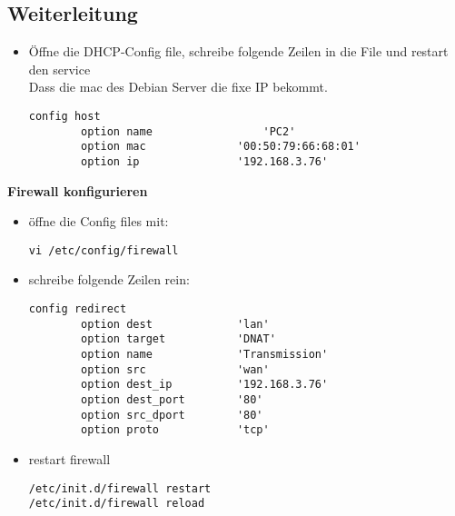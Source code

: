 \subsection{Weiterleitung}
\begin{itemize}
\item Öffne die DHCP-Config file, schreibe folgende Zeilen in die File und restart den service \\ Dass die mac des Debian Server die fixe IP bekommt.
\begin{verbatim}
config host
        option name 				'PC2'
        option mac 				'00:50:79:66:68:01'
        option ip 				'192.168.3.76'
\end{verbatim}
\end{itemize}
\textbf{Firewall konfigurieren}
\begin{itemize}
\item öffne die Config files mit:
\begin{verbatim}
vi /etc/config/firewall
\end{verbatim}
\item schreibe folgende Zeilen rein:
\begin{verbatim}
config redirect                                        
        option dest             'lan'              
        option target           'DNAT'             
        option name             'Transmission'         
        option src              'wan'               
        option dest_ip          '192.168.3.76'         
        option dest_port        '80'                   
        option src_dport        '80'               
        option proto            'tcp'  
\end{verbatim}
\item restart firewall
\begin{verbatim}
/etc/init.d/firewall restart
/etc/init.d/firewall reload
\end{verbatim}
\end{itemize}
